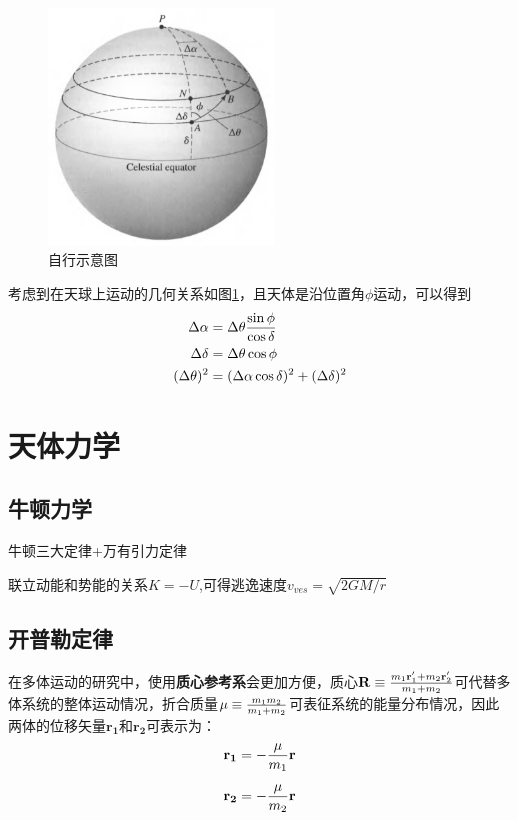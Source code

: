 \documentclass[openany]{ctexbook}
\begin{document}
\begin{figure}[hbt]
  \centering
  \includegraphics[width=6cm]{chapters/01/propermotion}
  \caption{自行示意图}
  \label{fig:proper}
\end{figure}


考虑到在天球上运动的几何关系如图\ref{fig:proper}，且天体是沿位置角$\phi$运动，可以得到
\begin{align}
   \Delta\alpha &=\Delta\theta{\sin \phi \over \cos \delta}\\
   \Delta\delta &=\Delta\theta\cos\phi\\
   (\Delta\theta)^2 &=(\Delta\alpha\cos\delta)^2+(\Delta\delta)^2
\end{align}


\chapter{天体力学}
\section{牛顿力学}
牛顿三大定律+万有引力定律

联立动能和势能的关系$K=-U$,可得逃逸速度$v_{ves}=\sqrt{2GM/r}$

\section{开普勒定律}
在多体运动的研究中，使用{\bf 质心参考系}会更加方便，质心$\mathbf{R}\equiv {m_1 \mathbf{r}'_1+m_2
\mathbf{r}'_2 \over m_1+m_2} $可代替多体系统的整体运动情况，折合质量$\mu \equiv {m_1m_2 \over m_1
+m_2}$可表征系统的能量分布情况，因此两体的位移矢量$\mathbf{r_1}$和$\mathbf{r_2}$可表示为：
\begin{align}\label{eq:r}
  \mathbf{r_1} &=-{\mu\over m_1}\mathbf r\\[2mm]
  \mathbf{r_2} &=-{\mu\over m_2}\mathbf r
\end{align}
\end{document}
